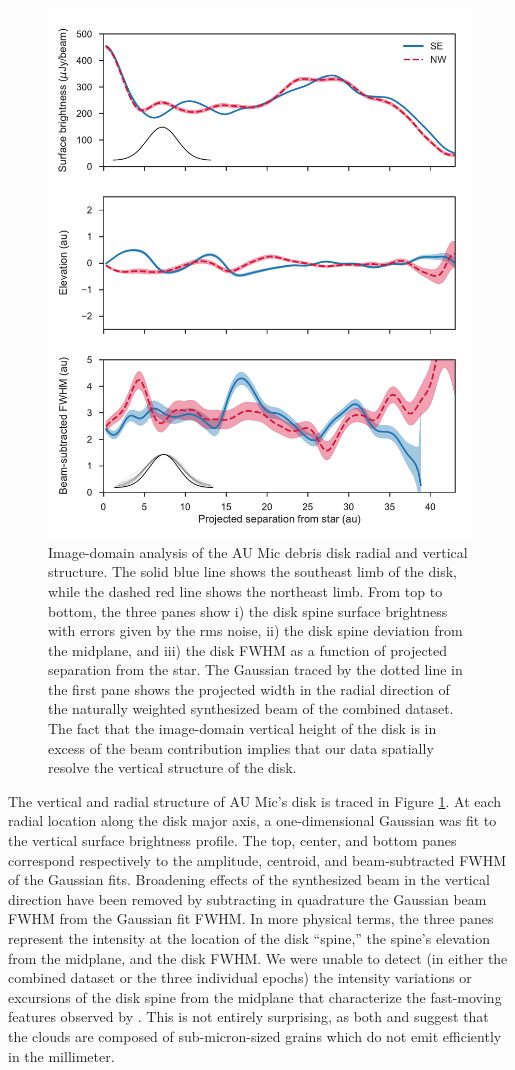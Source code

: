 \documentclass[12pt,oneside]{book}
\begin{document}
\begin{figure}
  \centering
  \includegraphics[width=.75\linewidth]{../figures/boccaletti_plots}
  \caption{
  Image-domain analysis of the AU Mic debris disk radial and vertical structure. 
  The solid blue line shows the southeast limb of the disk, while the dashed red line shows the northeast limb.
  From top to bottom, the three panes show i) the disk spine surface brightness with errors given by the rms noise, ii) the disk spine deviation from the midplane, and iii) the disk FWHM as a function of projected separation from the star. 
  The Gaussian traced by the dotted line in the first pane shows the projected width in the radial direction of the naturally weighted synthesized beam of the combined dataset.
  The fact that the image-domain vertical height of the disk is in excess of the beam contribution implies that our data spatially resolve the vertical structure of the disk.} 
  \label{fig: boccaletti}
\end{figure}

The vertical and radial structure of AU Mic's disk is traced in Figure \ref{fig: boccaletti}. 
At each radial location along the disk major axis, a one-dimensional Gaussian was fit to the vertical surface brightness profile.
The top, center, and bottom panes correspond respectively to the amplitude, centroid, and beam-subtracted FWHM of the Gaussian fits. 
Broadening effects of the synthesized beam in the vertical direction have been removed by subtracting in quadrature the Gaussian beam FWHM from the Gaussian fit FWHM.
In more physical terms, the three panes represent the intensity at the location of the disk ``spine,'' the spine's elevation from the midplane, and the disk FWHM.
We were unable to detect (in either the combined dataset or the three individual epochs) the intensity variations or excursions of the disk spine from the midplane that characterize the fast-moving features observed by \cite{boccaletti15}.
This is not entirely surprising, as both \cite{sezestre17} and \cite{chiang&fung17} suggest that the clouds are composed of sub-micron-sized grains which do not emit efficiently in the millimeter.
\end{document}
